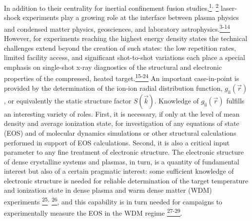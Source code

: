 In addition to their centrality for inertial confinement fusion
studies,\hyperref[j.-d.-lindl-p.-amendt-r.-l.-berger-s.-g.-glendinning-s.-h.-glenzer-s.-w.-haan-r.-l.-kauffman-o.-l.-landen-and-l.-j.-suter-physics-of-plasmas-11-339-2004.]{\textsuperscript{1}}\textsuperscript{,}
\hyperref[e.-i.-moses-nuclear-fusion-49-104022-2009.]{\textsuperscript{2}}
laser-shock experiments play a growing role at the interface between
plasma physics and condensed matter physics, geosciences, and laboratory
astrophysics.\hyperref[f.-langenhorst-m.-boustie-a.-migault-and-j.-p.-romain-earth-and-planetary-science-letters-173-333-1999.]{\textsuperscript{3-14}}
However, for experiments reaching the highest energy density states the
technical challenges extend beyond the creation of such states: the low
repetition rates, limited facility access, and significant shot-to-shot
variations each place a special emphasis on single-shot x-ray
diagnostics of the structural and electronic properties of the
compressed, heated
target.\hyperref[b.-k.-f.-young-et-al.-review-of-scientific-instruments-69-4049-1998.]{\textsuperscript{15-24}}
An important case-in-point is provided by the determination of the
ion-ion radial distribution function,
\(g_{\text{ii}}\left( \overrightarrow{r} \right)\), or equivalently the
static structure factor \(S(\overrightarrow{k})\). Knowledge of
\(g_{\text{ii}}\left( \overrightarrow{r} \right)\) fulfills an
interesting variety of roles. First, it is necessary, if only at the
level of mean density and average ionization state, for investigation of
any equations of state (EOS) and of molecular dynamics simulations or
other structural calculations performed in support of EOS calculations.
Second, it is also a critical input parameter to any fine treatment of
electronic structure. The electronic structure of dense crystalline
systems and plasmas, in turn, is a quantity of fundamental interest but
also of a certain pragmatic interest: some sufficient knowledge of
electronic structure is needed for reliable determination of the target
temperature and ionization state in dense plasma and warm dense matter
(WDM) experiments
\hyperref[s.-h.-glenzer-and-r.-redmer-reviews-of-modern-physics-81-1625-2009.]{\textsuperscript{25}}\textsuperscript{,}
\hyperref[g.-gregori-et-al.-physics-of-plasmas-11-2754-2004.]{\textsuperscript{26}}\hyperref[s.-h.-glenzer-and-r.-redmer-reviews-of-modern-physics-81-1625-2009.]{},
and this capability is in turn needed for campaigns to experimentally
measure the EOS in the WDM regime
\hyperref[h.-j.-lee-et-al.-physical-review-letters-102-115001-2009.]{\textsuperscript{27-29}}.

